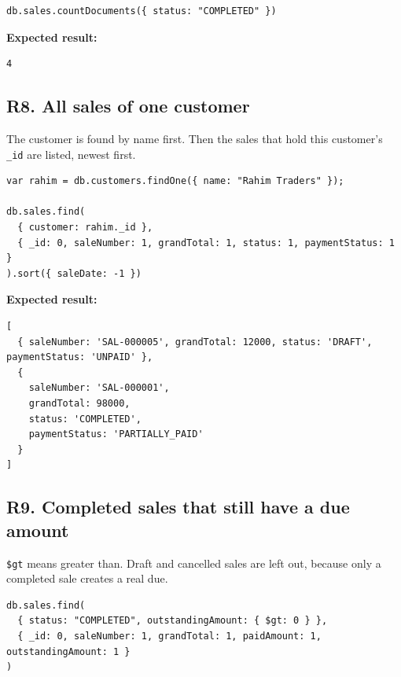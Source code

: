 \documentclass[11pt,a4paper]{article}
\newcommand{\code}[1]{\texttt{#1}}
\begin{document}
\begin{minipage}{\linewidth}
\begin{lstlisting}[style=query]
db.sales.countDocuments({ status: "COMPLETED" })
\end{lstlisting}
\end{minipage}

\noindent\textbf{Expected result:}
\begin{lstlisting}[style=result]
4
\end{lstlisting}

\subsection*{R8. All sales of one customer}
The customer is found by name first. Then the sales that hold this customer's \code{\_id} are listed, newest first.

\begin{minipage}{\linewidth}
\begin{lstlisting}[style=query]
var rahim = db.customers.findOne({ name: "Rahim Traders" });

db.sales.find(
  { customer: rahim._id },
  { _id: 0, saleNumber: 1, grandTotal: 1, status: 1, paymentStatus: 1 }
).sort({ saleDate: -1 })
\end{lstlisting}
\end{minipage}

\noindent\textbf{Expected result:}
\begin{lstlisting}[style=result]
[
  { saleNumber: 'SAL-000005', grandTotal: 12000, status: 'DRAFT', paymentStatus: 'UNPAID' },
  {
    saleNumber: 'SAL-000001',
    grandTotal: 98000,
    status: 'COMPLETED',
    paymentStatus: 'PARTIALLY_PAID'
  }
]
\end{lstlisting}

\subsection*{R9. Completed sales that still have a due amount}
\code{\$gt} means greater than. Draft and cancelled sales are left out, because only a completed sale creates a real due.

\begin{minipage}{\linewidth}
\begin{lstlisting}[style=query]
db.sales.find(
  { status: "COMPLETED", outstandingAmount: { $gt: 0 } },
  { _id: 0, saleNumber: 1, grandTotal: 1, paidAmount: 1, outstandingAmount: 1 }
)
\end{lstlisting}
\end{minipage}
\end{document}
